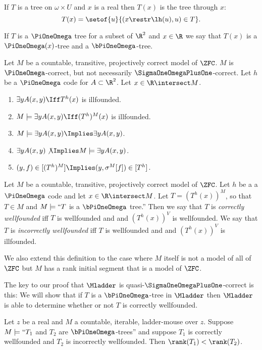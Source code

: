 \documentclass[oneside,12pt]{amsart}
\begin{document}
\begin{definition}
If $T$ is a tree on $\omega\times U$ and $x$ is a real then $T(x)$ is the tree through $x$:
$$T(x) = \setof{u}{(x\restr \lh(u), u) \in T}.$$

If $T$ is a $\PiOneOmega$ tree for a subset of $\R^2$ and $x\in\R$
we say that $T(x)$ is a $\PiOneOmega(x)$-tree
and a $\bPiOneOmega$-tree.
\end{definition}

\begin{remarks}
\label{remarks-about-correctness}
Let $M$ be a countable, transitive, projectively correct model of $\ZFC$.
$M$ is $\PiOneOmega$-correct, but not necessarily $\SigmaOneOmegaPlusOne$-correct.
Let $h$ be a $\PiOneOmega$ code for $A\subset\R^2$.
Let $x\in\R\intersect M$.
\begin{enumerate}
\item $\exists y A(x,y) \Iff T^h(x)$ is illfounded.
\item $M\models \exists y A(x,y) \Iff (T^h)^M(x)$ is illfounded.
\item $M\models \exists y A(x,y) \Implies \exists y A(x,y)$.
\item $\exists y A(x,y) \not\Implies M\models \exists y A(x,y)$.
\item $(y,f)\in[(T^h)^M] \Implies (y, \sigma^M[f]) \in [T^h]$.
\end{enumerate}
\end{remarks}

\begin{definition}
Let $M$ be a countable, transitive, projectively correct model of $\ZFC$. 
Let $h$ be a a $\PiOneOmega$ code and let $x\in \R\intersect M$.
Let $T=(T^h(x))^M$, so that $T\in M$ and $M\models ``T$ is a $\bPiOneOmega$ tree.''
Then we say that $T$ is \emph{correctly wellfounded} iff $T$ is wellfounded and
and $(T^h(x))^V$ is wellfounded. 
We say that $T$ is \emph{incorrectly wellfounded} iff $T$ is wellfounded and 
and $(T^h(x))^V$ is illfounded. 

We also extend this definition to the case where $M$ itself is not a model of all of $\ZFC$ but
$M$ has a rank initial segment that is a model of $\ZFC$.
\end{definition}

The key to our proof that $\Mladder$ is quasi-$\SigmaOneOmegaPlusOne$-correct is this:
We will show that if $T$ is a $\bPiOneOmega$-tree in $\Mladder$ then
$\Mladder$ is able to determine whether or not $T$ is correctly wellfounded.

\begin{theorem}
\label{CorrectBelowIncorrect}
Let $z$ be a real and $M$ a countable, iterable, ladder-mouse over $z$.
Suppose $M\models ``T_1$ and $T_2$ are $\bPiOneOmega$-trees'' and
suppose $T_1$ is correctly wellfounded and
$T_2$ is incorrectly wellfounded. Then $\rank(T_1) < \rank(T_2)$.
\end{theorem}
\end{document}
